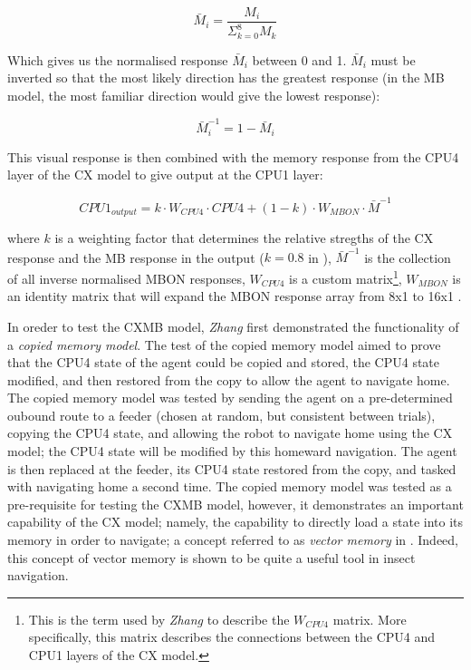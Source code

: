 \documentclass[a4paper,11pt,twoside,openright]{article}
\begin{document}
\begin{equation}
  \bar{M}_i = \frac{M_i}{\Sigma^{8}_{k = 0} M_k}
\end{equation}

Which gives us the normalised response $\bar{M}_i$ between 0 and 1. $\bar{M}_i$
must be inverted so that the most likely direction has the greatest response
(in the MB model, the most familiar direction would give the lowest response):

\begin{equation}
  \bar{M}^{-1}_i = 1 - \bar{M}_i
\end{equation}

This visual response is then combined with the memory response from the CPU4
layer of the CX model to give output at the CPU1 layer:

\begin{equation}
  CPU1_{output} = k \cdot W_{CPU4} \cdot CPU4 + (1 - k) \cdot W_{MBON} \cdot
  \bar{M}^{-1}
\end{equation}

where $k$ is a weighting factor that determines the relative stregths of the CX
response and the MB response in the output ($k = 0.8$ in \cite{Zhang2017}),
$\bar{M}^{-1}$ is the collection of all inverse normalised MBON responses,
$W_{CPU4}$ is a custom matrix\footnote{This is the term used by \textit{Zhang} to
  describe   the $W_{CPU4}$ matrix. More specifically, this matrix describes the
  connections between the CPU4 and CPU1 layers of the CX model.}, $W_{MBON}$ is
an identity matrix that will expand the MBON response array from 8x1 to 16x1
\cite{Zhang2017}.
\newline
\par

In oreder to test the CXMB model, \textit{Zhang} first demonstrated the
functionality of a \textit{copied memory model}. The test of the copied memory
model aimed to prove that the CPU4 state of the agent could be copied and stored,
the CPU4 state modified, and then restored from the copy to allow the agent to
navigate home. The copied memory model was tested by sending the agent on a
pre-determined oubound route to a feeder (chosen at random, but consistent
between trials), copying the CPU4 state, and allowing the robot to navigate home
using the CX model; the CPU4 state will be modified by this homeward navigation.
The agent is then replaced at the feeder, its CPU4 state restored from the copy,
and tasked with navigating home a second time. The copied memory model was tested
as a pre-requisite for testing the CXMB model, however, it demonstrates an
important capability of the CX model; namely, the capability to directly load a
state into its memory in order to navigate; a concept referred to as
\textit{vector memory} in \cite{Webb2018}. Indeed, this concept of vector memory
is shown to be quite a useful tool in insect navigation\cite{Webb2018}.
\newline
\par
\end{document}
